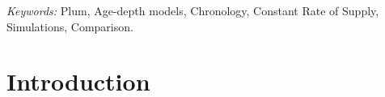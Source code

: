 \documentclass [10pt] {article}
\begin{document}
\begin{abstract}
\end{abstract}
	\noindent%
	{\it Keywords:} Plum, Age-depth models, Chronology, Constant Rate of Supply, Simulations, Comparison.
	\vfill
	\newpage

\section{Introduction}

\end{document}
